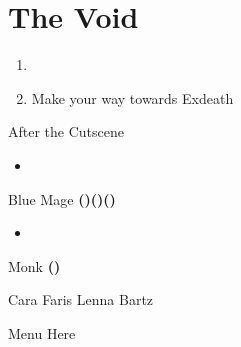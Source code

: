 \chapter{The Void}

\vspace{\baselineskip}

\begin{paracol}{2}

\begin{enumerate}
    \item {}
    \item Make your way towards Exdeath
\end{enumerate}

\begin{menu}{After the Cutscene}
	\varwb
    \begin{abilityMenu}
        \bartz \ability{!\gilToss} \optimize
        \lenna \ability{!\cover} 
        \begin{itemize}
            \item[] \equip{\knife, \crystalShield}
        \end{itemize}
    \end{abilityMenu}
    \begin{jobMenu}
        \faris Blue Mage \textbf{(\pointDown)(\pointLeft)(\pointDown)} \ability{\combine} 
        \begin{itemize}
            \item[] \equip{\runningShoes}
        \end{itemize} 
        \cara Monk \textbf{(\pointRight)} \ability{!\gilToss} \optimize
    \end{jobMenu}
    \begin{rowMenu}
        \swap Cara \switch Faris
        \swap Lenna \switch Bartz
    \end{rowMenu}
    \varwe
\end{menu}

\switchcolumn
\begin{misc}{Menu Here}
\end{misc}


\end{paracol}
